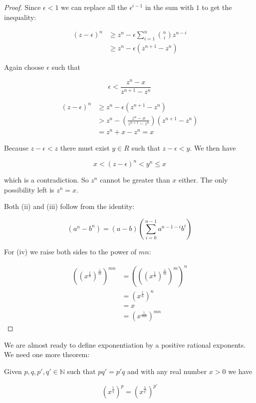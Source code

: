 \begin{proof}
Since $\epsilon < 1$ we can replace all the $\epsilon^{i-1}$ in the sum with $1$ to get the inequality:

\begin{align*}
(z - \epsilon)^n &\geq z^n - \epsilon \sum_{i = 1}^n \binom{n}{i} z^{n - i} \\
                 &\geq z^n - \epsilon (z^{n+1} - z^n)
\end{align*}

Again choose $\epsilon$ such that

$$
\epsilon < \frac{z^n - x}{z^{n+1} - z^n}
$$

\begin{align*}
(z - \epsilon)^n &\geq z^n - \epsilon (z^{n+1} - z^n) \\
                 &> z^n - (\frac{z^n - x}{z^{n+1} - z^n}) (z^{n+1} - z^n) \\
                 &= z^n + x - z^n = x
\end{align*}

Because $z - \epsilon < z$ there must exist  $y \in R$ such that $z - \epsilon < y$. We then have

$$
x < (z - \epsilon)^n < y^n \leq x
$$

which is a contradiction. So $z^n$ cannot be greater than $x$ either. The only possibility left is $z^n = x$.

Both (ii) and (iii) follow from the identity:

$$
(a^n - b^n) = (a - b)(\sum_{i = 0}^{n-1} a^{n -1 - i}b^i)
$$

For (iv) we raise both sides to the power of $m n$:

\begin{align*}
((x^{\frac{1}{n}})^{\frac{1}{m}})^{m n} &= (((x^{\frac{1}{n}})^{\frac{1}{m}})^m)^n \\
                                        &= (x^{\frac{1}{n}})^n \\
                                        &= x \\
                                        &= (x^{\frac{1}{m n}})^{m n}
\end{align*}

\end{proof}

We are almost ready to define exponentiation by a positive rational exponents. We need one more theorem:

\begin{thm}\label{bernoulli_rational_powers}
Given $p, q, p', q' \in \mathbb{N}$ such that $p q' = p' q$ and with any real number $x > 0$ we have

$$
(x^{\frac{1}{q}})^p = (x^{\frac{1}{q'}})^{p'}
$$

\end{thm}

